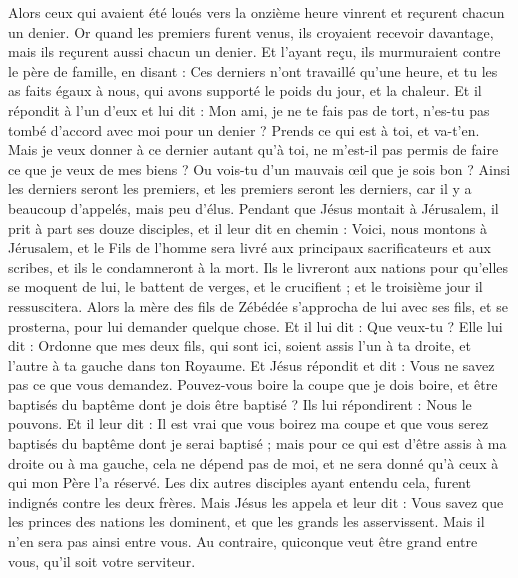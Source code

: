 \begin{multicols}{2}
Alors ceux qui avaient été loués vers la onzième heure vinrent et reçurent chacun un denier.
Or quand les premiers furent venus, ils croyaient recevoir davantage, mais ils reçurent aussi chacun un denier.
Et l'ayant reçu, ils murmuraient contre le père de famille,
en disant : Ces derniers n'ont travaillé qu'une heure, et tu les as faits égaux à nous, qui avons supporté le poids du jour, et la chaleur.
Et il répondit à l'un d'eux et lui dit : Mon ami, je ne te fais pas de tort, n'es-tu pas tombé d'accord avec moi pour un denier ?
Prends ce qui est à toi, et va-t’en. Mais je veux donner à ce dernier autant qu'à toi,
ne m'est-il pas permis de faire ce que je veux de mes biens ? Ou vois-tu d’un mauvais œil que je sois bon ?
Ainsi les derniers seront les premiers, et les premiers seront les derniers, car il y a beaucoup d'appelés, mais peu d'élus.
Pendant que Jésus montait à Jérusalem, il prit à part ses douze disciples, et il leur dit en chemin :
Voici, nous montons à Jérusalem, et le Fils de l'homme sera livré aux principaux sacrificateurs et aux scribes, et ils le condamneront à la mort.
Ils le livreront aux nations pour qu’elles se moquent de lui, le battent de verges, et le crucifient ; et le troisième jour il ressuscitera.
Alors la mère des fils de Zébédée s’approcha de lui avec ses fils, et se prosterna, pour lui demander quelque chose.
Et il lui dit : Que veux-tu ? Elle lui dit : Ordonne que mes deux fils, qui sont ici, soient assis l'un à ta droite, et l'autre à ta gauche dans ton Royaume.
Et Jésus répondit et dit : Vous ne savez pas ce que vous demandez. Pouvez-vous boire la coupe que je dois boire, et être baptisés du baptême dont je dois être baptisé ? Ils lui répondirent : Nous le pouvons.
Et il leur dit : Il est vrai que vous boirez ma coupe et que vous serez baptisés du baptême dont je serai baptisé ; mais pour ce qui est d'être assis à ma droite ou à ma gauche, cela ne dépend pas de moi, et ne sera donné qu’à ceux à qui mon Père l’a réservé.
Les dix autres disciples ayant entendu cela, furent indignés contre les deux frères.
Mais Jésus les appela et leur dit : Vous savez que les princes des nations les dominent, et que les grands les asservissent.
Mais il n'en sera pas ainsi entre vous. Au contraire, quiconque veut être grand entre vous, qu'il soit votre serviteur.

\end{multicols}
